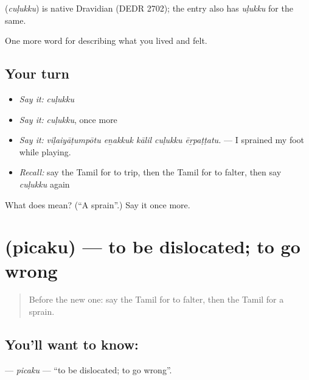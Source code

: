 \begin{cousinweb}
\textbf{} (\emph{cuḷukku}) is native Dravidian (DEDR 2702); the entry also has  \emph{uḷukku} for the same.
\end{cousinweb}

\begin{grammarlens}[title={What you've built}]
One more word for describing what you lived and felt.
\end{grammarlens}

\subsection*{Your turn}
\begin{itemize}
\raggedright
  \item \emph{Say it:} \emph{cuḷukku}
  \item \emph{Say it:} \emph{cuḷukku}, once more
  \item \emph{Say it:} \emph{viḷaiyāṭumpōtu eṉakkuk kālil cuḷukku ēṟpaṭṭatu.} — I sprained my foot while playing.
  \item \emph{Recall:} say the Tamil for to trip, then the Tamil for to falter, then say \emph{cuḷukku} again
\end{itemize}

\begin{tcolorbox}[breakable,colback=teal!4,colframe=teal!35!black,title={Before you move on}]
What does  mean? (\textquotedblleft{}A sprain\textquotedblright{}.) Say it once more.
\end{tcolorbox}
\section[\texorpdfstring{\ta{பிசகு} (picaku)}{பிசகு (picaku)}]{ (picaku) — to be dislocated; to go wrong}

\label{lesson:TA-C482-picaku}



\begin{quote}
Before the new one: say the Tamil for to falter, then the Tamil for a sprain.
\end{quote}

\subsection*{You'll want to know: }
\textbf{} — \emph{picaku} — \textquotedblleft{}to be dislocated; to go wrong\textquotedblright{}.

